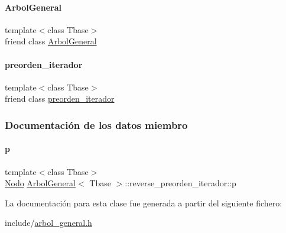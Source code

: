 \paragraph{\texorpdfstring{Arbol\+General}{ArbolGeneral}}
{\footnotesize\ttfamily template$<$class Tbase$>$ \\
friend class \hyperlink{classArbolGeneral}{Arbol\+General}\hspace{0.3cm}{\ttfamily [friend]}}

\hypertarget{classArbolGeneral_1_1reverse__preorden__iterador_a4aa0da8bfbc320a8daff98451ee65b6c}{}\label{classArbolGeneral_1_1reverse__preorden__iterador_a4aa0da8bfbc320a8daff98451ee65b6c} 
\paragraph{\texorpdfstring{preorden\+\_\+iterador}{preorden\_iterador}}
{\footnotesize\ttfamily template$<$class Tbase$>$ \\
friend class \hyperlink{classArbolGeneral_1_1preorden__iterador}{preorden\+\_\+iterador}\hspace{0.3cm}{\ttfamily [friend]}}



\subsubsection{Documentación de los datos miembro}
\hypertarget{classArbolGeneral_1_1reverse__preorden__iterador_a002862fdee453a84b037e5dd26c071a2}{}\label{classArbolGeneral_1_1reverse__preorden__iterador_a002862fdee453a84b037e5dd26c071a2} 
\paragraph{\texorpdfstring{p}{p}}
{\footnotesize\ttfamily template$<$class Tbase$>$ \\
\hyperlink{classArbolGeneral_a12cc1b74a9095d89bc7334290d332f7a}{Nodo} \hyperlink{classArbolGeneral}{Arbol\+General}$<$ Tbase $>$\+::reverse\+\_\+preorden\+\_\+iterador\+::p\hspace{0.3cm}{\ttfamily [private]}}



La documentación para esta clase fue generada a partir del siguiente fichero\+:\begin{DoxyCompactItemize}
\item 
include/\hyperlink{arbol__general_8h}{arbol\+\_\+general.\+h}\end{DoxyCompactItemize}
